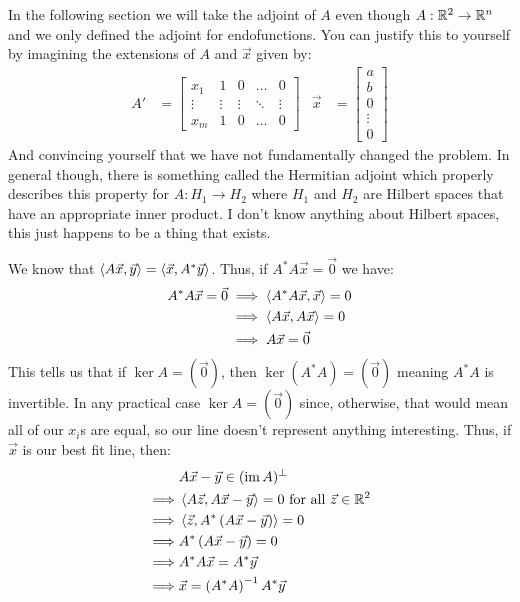 \begin{remark}
  In the following section we will take the adjoint of $A$ even though $A : \mathbb{R}^2 \to \mathbb{R}^n$ and we only defined the adjoint for endofunctions.
  You can justify this to yourself by imagining the extensions of $A$ and $\vec x$ given by:
  \begin{align*}
    A' &= \begin{bmatrix}
      x_1 & 1 & 0 & \ldots & 0 \\
      \vdots & \vdots & \vdots & \ddots & \vdots \\
      x_m & 1 & 0 & \ldots & 0
    \end{bmatrix} &
    \vec x &= \begin{bmatrix}a \\ b \\ 0 \\ \vdots \\ 0\end{bmatrix}
  \end{align*}
  And convincing yourself that we have not fundamentally changed the problem.
  In general though, there is something called the Hermitian adjoint which properly describes this property for $A : H_1 \to H_2$ where $H_1$ and $H_2$ are Hilbert spaces that have an appropriate inner product.
  I don't know anything about Hilbert spaces, this just happens to be a thing that exists.
\end{remark}

We know that $\left\langle A\vec x , \vec y \right\rangle = \left\langle \vec x , A^*\vec y \right\rangle$. Thus, if $A^*A \vec x = \vec 0$ we have:
\begin{align}
  A^*A\vec x = \vec 0
    &\implies \left\langle A^*A\vec x , \vec x \right\rangle = 0 \\
    &\implies \left\langle A\vec x , A \vec x \right\rangle = 0 \\
    &\implies A\vec x = \vec 0
\end{align}
This tells us that if $\ker A = (\vec 0)$, then $\ker (A^*A) = (\vec 0)$ meaning $A^*A$ is invertible.
In any practical case $\ker A = (\vec 0)$ since, otherwise, that would mean all of our $x_i$s are equal, so our line doesn't represent anything interesting.
Thus, if $\vec x$ is our best fit line, then:
\begin{align}
           & A \vec x - \vec y \in (\operatorname{im} A)^\perp \\
  \implies & \left\langle A \vec z , A\vec x - \vec y \right\rangle = 0 \text{ for all } \vec z \in \mathbb{R}^2 \\
  \implies & \left\langle \vec z , A^*\left(A \vec x - \vec y\right) \right\rangle = 0 \\
  \implies & A^*\left(A \vec x - \vec y\right) = 0 \\
  \implies & A^*A\vec x = A^* \vec y \\
  \implies & \vec x = \left(A^*A\right)^{-1}A^* \vec y
\end{align}
